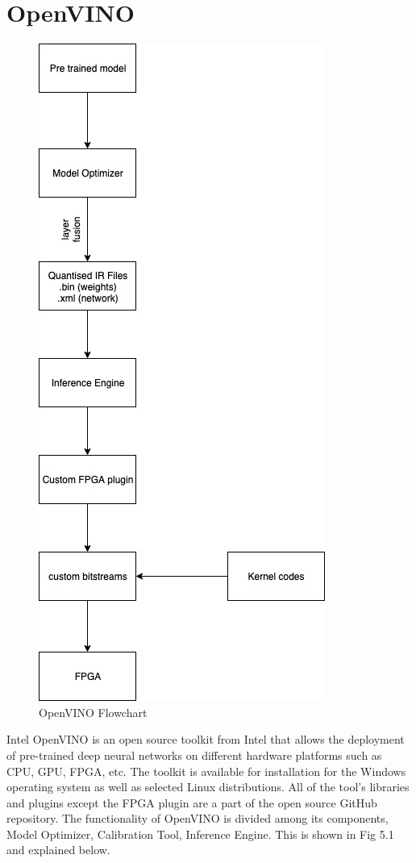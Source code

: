 \documentclass[titlepage]{report}
\begin{document}
\section{OpenVINO}
\begin{figure}[!]
    \centering
    \includegraphics[scale=0.65]{open_vino_flowchart.jpg}
    \caption{OpenVINO Flowchart}
\end{figure}

Intel OpenVINO is an open source toolkit from Intel that allows the deployment of pre-trained deep neural networks on different hardware platforms such as CPU, GPU, FPGA, etc. The toolkit is available for installation for the Windows operating system as well as selected Linux distributions. All of the tool's libraries and plugins except the FPGA plugin are a part of the open source GitHub repository.
The functionality of OpenVINO is divided among its components, Model Optimizer, Calibration Tool, Inference Engine. This is shown in Fig 5.1 and explained below. 
\end{document}
